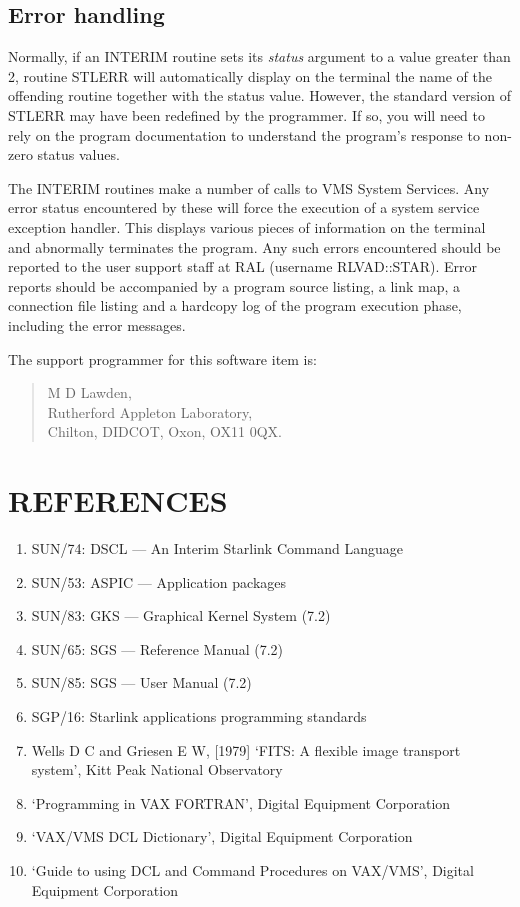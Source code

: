 \subsection {Error handling}
Normally, if an INTERIM routine sets its {\em status} argument to a value greater
than 2, routine STLERR will automatically display on the terminal the name
of the offending routine together with the status value.
However, the standard version of STLERR may have been redefined by the
programmer.
If so, you will need to rely on the program documentation to understand the
program's response to non-zero status values.

The INTERIM routines make a number of calls to VMS System Services.
Any error status encountered by these will force the execution of a system
service exception handler.
This displays various pieces of information on the terminal and abnormally
terminates the program.
Any such errors encountered should be reported to the user support staff at
RAL (username RLVAD::STAR).
Error reports should be accompanied by a program source listing, a link map, a
connection file listing and a hardcopy log of the program execution phase,
including the  error messages.

The support programmer for this software item is:
\begin{quote}
M D Lawden,\\
Rutherford Appleton Laboratory,\\
Chilton, DIDCOT, Oxon, OX11 0QX.
\end{quote}
\section {REFERENCES}
\begin{enumerate}
\item SUN/74: DSCL --- An Interim Starlink Command Language
\item SUN/53: ASPIC --- Application packages
\item SUN/83: GKS --- Graphical Kernel System (7.2)
\item SUN/65: SGS --- Reference Manual (7.2)
\item SUN/85: SGS --- User Manual (7.2)
\item SGP/16: Starlink applications programming standards
\item Wells D C and Griesen E W,  [1979] `FITS: A flexible image
transport system', Kitt Peak National Observatory
\item `Programming in VAX FORTRAN', Digital Equipment Corporation
\item `VAX/VMS DCL Dictionary', Digital Equipment Corporation
\item `Guide to using DCL and Command Procedures on VAX/VMS',
Digital Equipment Corporation
\end{enumerate}
\appendix
